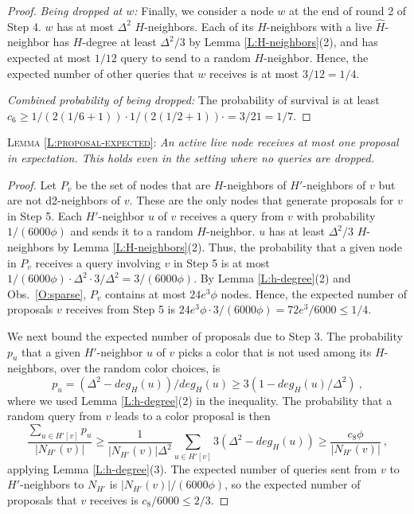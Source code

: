 \begin{proof}
\textit{Being dropped at $w$:} Finally, we consider a node $w$ at the end of round 2 of Step 4. $w$ has at most $\Delta^2$ $H$-neighbors. Each of its $H$-neighbors with a live $\hat{H}$-neighbor has $H$-degree at least $\Delta^2/3$ by Lemma \ref{L:H-neighbors}(2), 
and has expected at most $1/12$ query to send to a random $H$-neighbor. 
Hence, the expected number of other queries that $w$ receives is at most $3/12=1/4$. 

\textit{Combined probability of being dropped:} The probability of survival is at least $c_6 \ge 1/(2(1/6+1)) \cdot 1/(2(1/2+1)) \cdot = 3/21 = 1/7$.
\end{proof}

 \textsc{Lemma \ref{L:proposal-expected}}: \emph{ 
 An active live node receives at most one proposal in expectation. This holds even in the setting where no queries are dropped. }
 \begin{proof}
  Let $P_v$ be the set of nodes that are $H$-neighbors of $H'$-neighbors of $v$ but are not d2-neighbors of $v$. These are the only nodes that generate proposals for $v$ in Step 5. Each $H'$-neighbor $u$ of $v$ receives a query from $v$ with probability $1/(6000\phi)$ and sends it to a random $H$-neighbor. $u$ has at least $\Delta^2/3$ $H$-neighbors by Lemma \ref{L:H-neighbors}(2). Thus, the probability that a given node in $P_v$ receives a query involving $v$ in Step 5 is at most $1/(6000\phi) \cdot \Delta^2 \cdot 3/\Delta^2 = 3/(6000\phi)$. By Lemma \ref{L:h-degree}(2) and Obs.~\ref{O:sparse}, $P_v$ contains at most $24 e^3 \phi$ nodes. Hence, the expected number of proposals $v$ receives from Step 5 is $24 e^3\phi \cdot 3/(6000\phi) = 72e^3/6000 \le 1/4$.

We next bound the expected number of proposals due to Step 3.
The probability $p_u$ that a given $H'$-neighbor $u$ of $v$ picks a color that is not used among its $H$-neighbors, over the random color choices, is 
\[p_u = (\Delta^2 - deg_{H}(u))/deg_{H}(u) \ge 3(1 - deg_H(u)/\Delta^2)\ , \] 
where we used Lemma \ref{L:h-degree}(2) in the inequality.
The probability that a random query from $v$ leads to a color proposal is then 
  \[ \frac{\sum_{u \in H'[v]} p_u}{|N_{H'}(v)|} \ge \frac{1}{|N_{H'}(v)|\Delta^2} \sum_{u \in H'[v]} 3 \left(\Delta^2 - deg_H(u)\right) \ge  \frac{c_8 \phi}{|N_{H'}(v)|}\ ,  \]  
applying Lemma \ref{L:h-degree}(3). The expected number of queries sent from $v$ to $H'$-neighbors to $N_{H'}$ is $|N_{H'}(v)|/(6000\phi)$, so the expected number of proposals that $v$ receives is $c_8/6000 \le 2/3$.
\end{proof}

